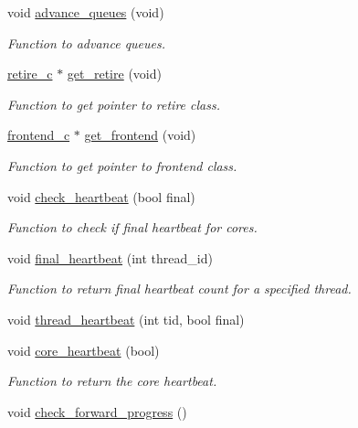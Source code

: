 \begin{DoxyCompactItemize}
void \hyperlink{classcore__c_ac23fd07eb75d23cdeaa51e919cd4903c}{advance\_\-queues} (void)
\begin{DoxyCompactList}\small\item\em Function to advance queues. \item\end{DoxyCompactList}\item 
\hyperlink{classretire__c}{retire\_\-c} $\ast$ \hyperlink{classcore__c_a2accf9f0068b91c0d9b49159a735f156}{get\_\-retire} (void)
\begin{DoxyCompactList}\small\item\em Function to get pointer to retire class. \item\end{DoxyCompactList}\item 
\hyperlink{classfrontend__c}{frontend\_\-c} $\ast$ \hyperlink{classcore__c_ae8174e03b72b49e35782fc1c44393101}{get\_\-frontend} (void)
\begin{DoxyCompactList}\small\item\em Function to get pointer to frontend class. \item\end{DoxyCompactList}\item 
void \hyperlink{classcore__c_adeeafc6bd6731b44e2b0cf0145ad5b7b}{check\_\-heartbeat} (bool final)
\begin{DoxyCompactList}\small\item\em Function to check if final heartbeat for cores. \item\end{DoxyCompactList}\item 
void \hyperlink{classcore__c_a804dafe06904840d0cf3307ccfe93d1e}{final\_\-heartbeat} (int thread\_\-id)
\begin{DoxyCompactList}\small\item\em Function to return final heartbeat count for a specified thread. \item\end{DoxyCompactList}\item 
void \hyperlink{classcore__c_a90bd3acc1df6072ba19697266a010e6e}{thread\_\-heartbeat} (int tid, bool final)
\item 
void \hyperlink{classcore__c_ab9192b0fd1cb384d636147098e4d70f5}{core\_\-heartbeat} (bool)
\begin{DoxyCompactList}\small\item\em Function to return the core heartbeat. \item\end{DoxyCompactList}\item 
\hypertarget{classcore__c_ae85f0e863d35292f3713475a5c10c52c}{
void \hyperlink{classcore__c_ae85f0e863d35292f3713475a5c10c52c}{check\_\-forward\_\-progress} ()}
\label{classcore__c_ae85f0e863d35292f3713475a5c10c52c}


\end{DoxyCompactItemize}
